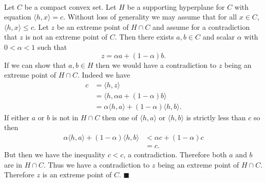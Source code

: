 \documentclass[letterpaper,12pt,oneside,onecolumn]{article}
\begin{document}
\paragraph{}
Let $C$ be a compact convex set. Let $H$ be a supporting hyperplane for $C$ with equation $\langle h,x \rangle = c$. Without loss of generality we may assume that for all $x \in C$, $\langle h,x \rangle \leq c$. Let $z$ be an extreme point of $H\cap C$ and assume for a contradiction that $z$ is not an extreme point of $C$. Then there exists $a,b \in C$ and scalar $\alpha$ with $0<\alpha<1$ such that $$z = \alpha a + (1-\alpha)b.$$
If we can show that $a,b \in H$ then we would have a contradiction to $z$ being an extreme point of $H\cap C$. Indeed we have
\begin{align*}
c &= \langle h,z \rangle \\
&= \langle h, \alpha a + (1-\alpha)b \rangle\\
&= \alpha \langle h,a\rangle + (1-\alpha)\langle h,b \rangle.
\end{align*}
If either $a$ or $b$ is not in $H \cap C$ then one of $\langle h,a \rangle$ or $\langle h,b \rangle $ is strictly less than $c$ so then
\begin{align*}
\alpha \langle h,a\rangle + (1-\alpha)\langle h,b \rangle &< \alpha c + (1-\alpha) c\\
&= c.
\end{align*}
But then we have the inequality $c < c$, a contradiction. Therefore both $a$ and $b$ are in $H \cap C$. Thus we have a contradiction to $z$ being an extreme point of $H \cap C$. Therefore $z$ is an extreme point of $C$. $\blacksquare$
\end{document}
